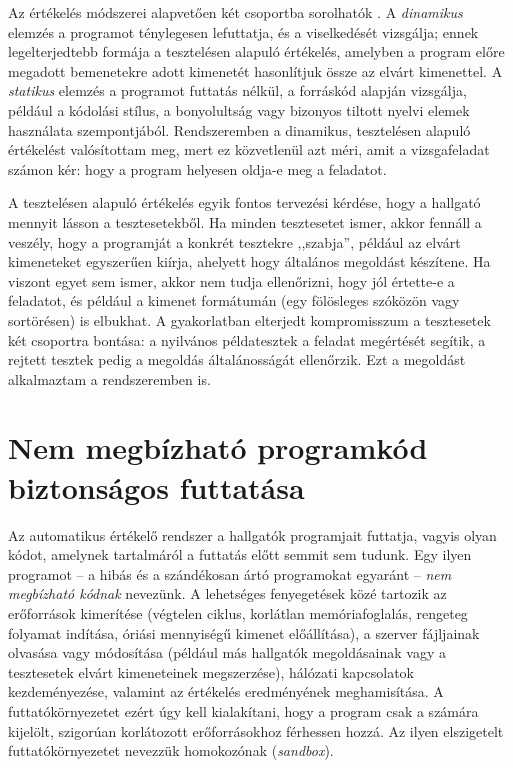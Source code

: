 Az értékelés módszerei alapvetően két csoportba sorolhatók \cite{paiva2022automated}. A
\textit{dinamikus} elemzés a programot ténylegesen lefuttatja, és a viselkedését vizsgálja;
ennek legelterjedtebb formája a tesztelésen alapuló értékelés, amelyben a program előre megadott
bemenetekre adott kimenetét hasonlítjuk össze az elvárt kimenettel. A \textit{statikus} elemzés
a programot futtatás nélkül, a forráskód alapján vizsgálja, például a kódolási stílus, a
bonyolultság vagy bizonyos tiltott nyelvi elemek használata szempontjából. Rendszeremben a
dinamikus, tesztelésen alapuló értékelést valósítottam meg, mert ez közvetlenül azt méri, amit a
vizsgafeladat számon kér: hogy a program helyesen oldja-e meg a feladatot.

A tesztelésen alapuló értékelés egyik fontos tervezési kérdése, hogy a hallgató mennyit lásson a
tesztesetekből. Ha minden tesztesetet ismer, akkor fennáll a veszély, hogy a programját a konkrét
tesztekre ,,szabja'', például az elvárt kimeneteket egyszerűen kiírja, ahelyett hogy általános
megoldást készítene. Ha viszont egyet sem ismer, akkor nem tudja ellenőrizni, hogy jól értette-e
a feladatot, és például a kimenet formátumán (egy fölösleges szóközön vagy sortörésen) is
elbukhat. A gyakorlatban elterjedt kompromisszum a tesztesetek két csoportra bontása: a
nyilvános példatesztek a feladat megértését segítik, a rejtett tesztek pedig a megoldás
általánosságát ellenőrzik. Ezt a megoldást alkalmaztam a rendszeremben is.

\section{Nem megbízható programkód biztonságos futtatása}
\label{sec:sandbox_elmelet}

Az automatikus értékelő rendszer a hallgatók programjait futtatja, vagyis olyan kódot, amelynek
tartalmáról a futtatás előtt semmit sem tudunk. Egy ilyen programot -- a hibás és a szándékosan
ártó programokat egyaránt -- \textit{nem megbízható kódnak} nevezünk. A lehetséges fenyegetések
közé tartozik az erőforrások kimerítése (végtelen ciklus, korlátlan memóriafoglalás, rengeteg
folyamat indítása, óriási mennyiségű kimenet előállítása), a szerver fájljainak olvasása vagy
módosítása (például más hallgatók megoldásainak vagy a tesztesetek elvárt kimeneteinek
megszerzése), hálózati kapcsolatok kezdeményezése, valamint az értékelés eredményének
meghamisítása. A futtatókörnyezetet ezért úgy kell kialakítani, hogy a program csak a
számára kijelölt, szigorúan korlátozott erőforrásokhoz férhessen hozzá. Az ilyen elszigetelt
futtatókörnyezetet nevezzük homokozónak (\textit{sandbox}).

